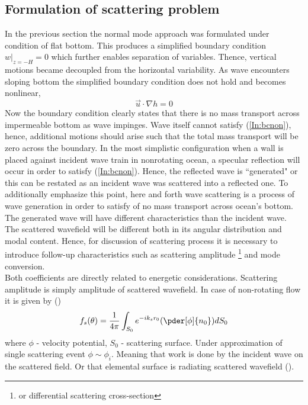 \subsection{Formulation of scattering problem}
In the previous section the normal mode approach was formulated under condition of flat bottom. This produces a simplified boundary condition $w|_{z = -H} = 0$ which further enables separation of variables. Thence, vertical motions became decoupled from the horizontal variability. As wave encounters sloping bottom the simplified boundary condition does not hold and becomes nonlinear,
\begin{equation}
\vec{u} \cdot \nabla h = 0 \label{In:bcnon}
\end{equation}
Now the boundary condition clearly states that there is no mass transport across impermeable bottom as wave impinges. Wave itself cannot satisfy (\ref{In:bcnon}), hence, additional motions should arise such that the total mass transport will be zero across the boundary. In the most simplistic configuration when a wall is placed against incident wave train in nonrotating ocean, a specular reflection will occur in order to satisfy (\ref{In:bcnon}). Hence, the reflected wave is ``generated" or this can be restated as an incident wave was scattered into a reflected one. To additionally emphasize this point, here and forth wave scattering is a process of wave generation in order to satisfy of no mass transport across ocean's bottom. The generated wave will have different characteristics than the incident wave. The scattered wavefield will be different both in its angular distribution and modal content. Hence, for discussion of scattering process it is necessary to introduce follow-up characteristics such as scattering amplitude \footnote{or differential scattering cross-section} and mode conversion.\\
Both coefficients are directly related to energetic considerations. Scattering amplitude is simply amplitude of scattered wavefield. In case of non-rotating flow it is given by (\cite{morse1946methods}) 
\begin{align}
f_s(\theta) = \frac{1}{4 \pi} \int_{S_0} e^{-i k_s r_0} (\pder[\phi]{n_0}) d S_0
\end{align}
where $\phi$ - velocity potential, $S_0$ - scattering surface. Under approximation of single scattering event $\phi \sim \phi_i$. Meaning that work is done by the incident wave on the scattered field. Or that elemental surface is radiating scattered wavefield (\cite{landau1988hydrodynamics}).\\
